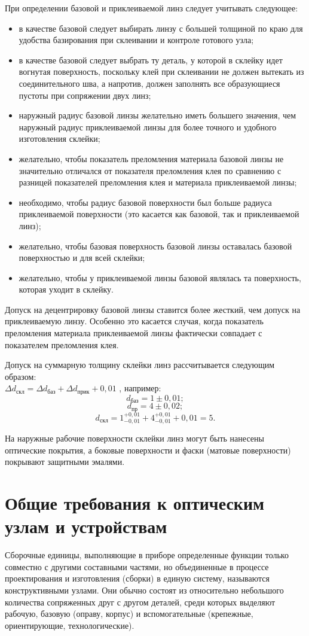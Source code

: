 При определении базовой и приклеиваемой линз следует учитывать следующее:
\begin{itemize}
\item в качестве базовой следует выбирать линзу с большей толщиной по краю для удобства базирования при склеивании и контроле готового узла;
\item в качестве базовой следует выбрать ту деталь, у которой в склейку идет вогнутая поверхность, поскольку клей при склеивании не должен вытекать из соединительного шва, а напротив, должен заполнять все образующиеся пустоты при сопряжении двух линз;
\item наружный радиус базовой линзы желательно иметь большего значения, чем наружный радиус приклеиваемой линзы для более точного и удобного изготовления склейки;
\item желательно, чтобы показатель преломления материала базовой линзы не значительно отличался от показателя преломления клея по сравнению с разницей показателей преломления клея и материала приклеиваемой линзы;
\item необходимо, чтобы радиус базовой поверхности был больше радиуса приклеиваемой поверхности (это касается как базовой, так и приклеиваемой линз);
\item желательно, чтобы базовая поверхность базовой линзы оставалась базовой поверхностью и для всей склейки;
\item желательно, чтобы у приклеиваемой линзы базовой являлась та поверхность, которая уходит в склейку.
\end{itemize}

Допуск на децентрировку базовой линзы ставится более жесткий, чем допуск на приклеиваемую линзу. Особенно это касается случая, когда показатель преломления материала приклеиваемой линзы фактически совпадает с показателем преломления клея.

Допуск на суммарную толщину склейки линз рассчитывается следующим образом: \\ $ \Delta d_\text{скл} = \Delta d_\text{баз} + \Delta d_\text{прик} + 0,01$ , например:
\[ d_\text{баз} = 1 \pm 0,01; \]  
\[ d_\text{пр} = 4 \pm 0,02; \] 
\[ d_\text{скл} = 1_{-0,01}^{+0,01}  + 4_{-0,01}^{+0,01} + 0,01 = 5. \]

На наружные рабочие поверхности склейки линз могут быть нанесены оптические покрытия, а боковые поверхности и фаски (матовые поверхности) покрывают защитными эмалями.

\section{Общие требования к оптическим узлам и устройствам}
Сборочные единицы, выполняющие в приборе определенные функции только совместно с другими составными частями, но объединенные в процессе проектирования и изготовления (сборки) в единую систему, называются конструктивными узлами. Они обычно состоят из относительно небольшого количества сопряженных друг с другом деталей, среди которых выделяют рабочую, базовую (оправу, корпус) и вспомогательные (крепежные, ориентирующие, технологические). 

